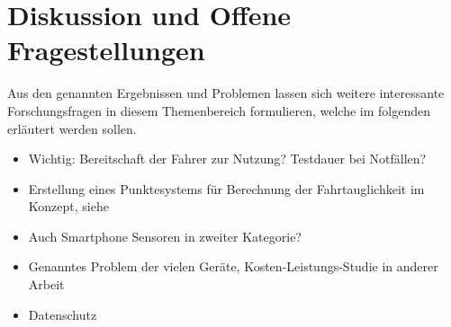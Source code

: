 \section{Diskussion und Offene Fragestellungen}
\label{openChallenges}
Aus den genannten Ergebnissen und Problemen lassen sich weitere interessante Forschungsfragen in diesem Themenbereich formulieren, welche im folgenden erläutert werden sollen.

\begin{itemize}
	\item Wichtig: Bereitschaft der Fahrer zur Nutzung? Testdauer bei Notfällen?
	\item Erstellung eines Punktesystems für Berechnung der Fahrtauglichkeit im Konzept, siehe \cite{drivesafe}
	\item Auch Smartphone Sensoren in zweiter Kategorie? \cite{monitoringstressheartrate, bewegungserkennungsensoren}
	\item Genanntes Problem der vielen Geräte, Kosten-Leistungs-Studie in anderer Arbeit
	\item Datenschutz \cite{beurteilungskriterienleipzig, securityprivacyfitnesstracking}
\end{itemize}
